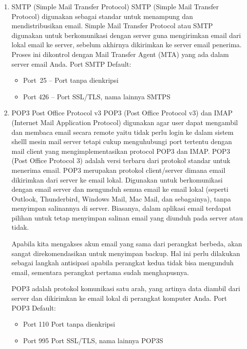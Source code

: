 	\begin{enumerate}
		\item  SMTP (Simple Mail Transfer Protocol) 
		 	SMTP (Simple Mail Transfer Protocol) digunakan sebagai standar untuk menampung dan mendistribusikan email. Simple Mail Transfer Protocol atau SMTP digunakan untuk berkomunikasi dengan server guna mengirimkan email dari lokal email ke server, sebelum akhirnya dikirimkan ke server email penerima. Proses ini dikontrol dengan Mail Transfer Agent (MTA) yang ada dalam server email Anda. Port SMTP Default:
			   
			\begin{itemize}
				\item Port~25 –  Port tanpa dienkripsi
				\item Port 426 – Port SSL/TLS, nama lainnya SMTPS
			\end{itemize}
 
		\item {POP3 Post Office Protocol v3}
			POP3 (Post Office Protocol v3) dan IMAP (Internet Mail Application Protocol) digunakan agar user dapat mengambil dan membaca email secara remote yaitu tidak perlu login ke dalam sistem shelll mesin mail server tetapi cukup menguhubungi port tertentu dengan mail client yang mengimplementasikan protocol POP3 dan IMAP.
			POP3 (Post Office Protocol 3) adalah versi terbaru dari protokol standar untuk menerima email. POP3 merupakan protokol client/server dimana email dikirimkan dari server ke email lokal. Digunakan untuk berkomunikasi dengan email server dan mengunduh semua email ke email lokal (seperti Outlook, Thunderbird, Windows Mail, Mac Mail, dan sebagainya), tanpa menyimpan salinannya di server. Biasanya, dalam aplikasi email terdapat pilihan untuk tetap menyimpan salinan email yang diunduh pada server atau tidak.

			Apabila kita mengakses akun email yang sama dari perangkat berbeda, akan sangat direkomendasikan untuk menyimpan backup. Hal ini perlu dilakukan sebagai langkah antisipasi apabila perangkat kedua tidak bisa mengunduh email, sementara perangkat pertama sudah menghapusnya. 

			POP3 adalah protokol komunikasi satu arah, yang artinya data diambil dari server dan dikirimkan ke email lokal di perangkat komputer Anda. 
Port POP3 Default:
		\begin{itemize}
			\item Port 110 Port tanpa dienkripsi
			\item Port 995 Port SSL/TLS, nama lainnya POP3S
		\end{itemize}
\end{enumerate}

